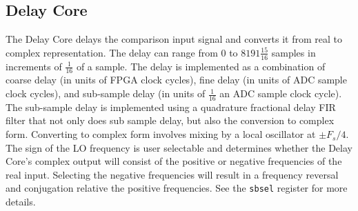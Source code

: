 \documentclass[12pt]{article}
\begin{document}
  \subsection{Delay Core}

The Delay Core delays the comparison input signal and converts it from real to
complex representation.  The delay can range from $0$ to $8191\frac{15}{16}$
samples in increments of $\frac{1}{16}$ of a sample.  The delay is implemented
as a combination of coarse delay (in units of FPGA clock cycles), fine delay
(in units of ADC sample clock cycles), and sub-sample delay (in units of
$\frac{1}{16}$ an ADC sample clock cycle).  The sub-sample delay is implemented
using a quadrature fractional delay FIR filter that not only does sub sample
delay, but also the conversion to complex form.  Converting to complex form
involves mixing by a local oscillator at $\pm F_s/4$.  The sign of the LO
frequency is user selectable and determines whether the Delay Core's complex
output will consist of the positive or negative frequencies of the real input.
Selecting the negative frequencies will result in a frequency reversal and
conjugation relative the positive frequencies.  See the \verb|sbsel| register
for more details.
\end{document}

